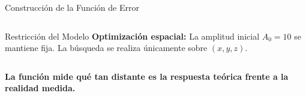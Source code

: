 \begin{frame}{Construcción de la Función de Error}
\begin{columns}[T]
        \vspace{0.1cm}

        \begin{block}{Restricción del Modelo}
            \scriptsize
            \textbf{Optimización espacial:} La amplitud inicial $A_0 = 10$ se mantiene fija. La búsqueda se realiza únicamente sobre $(x,y,z)$.
        \end{block}

    \end{columns}

    \vspace{0.3cm}
    \begin{center}
        \footnotesize 
        \textbf{La función mide qué tan distante es la respuesta teórica frente a la realidad medida.}
    \end{center}

\end{frame}